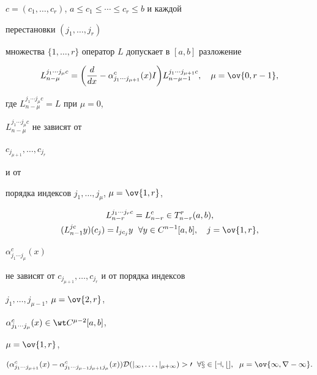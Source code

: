$c=(c_1,\dotsc,c_r)$, $a\le c_1\le\dotsb\le c_r\le b$ и каждой 


перестановки $(j_1,\dotsc,j_r)$ 


множества $\{1,\dotsc,r\}$ оператор $L$ допускает в $[a,b]$ разложение 


\begin{equation} 


L^{j_1\dotsb j_\mu c}_{n-\mu}=\bigg( 


\frac{d}{dx}-\alpha^c_{j_1\dotsb j_{\mu+1}}(x)I\bigg) 


L^{j_1\dotsb j_{\mu+1}c}_{n-\mu-1},\quad \mu=\ov{0,r-1}, 


\end{equation} 


где $L^{j_1\dotsb j_\mu c}_{n-\mu}=L$ при $\mu=0$, 


$L^{j_1\dotsb j_\mu c}_{n-\mu}$ не зависят от 


$c_{j_{\mu+1}},\dotsc,c_{j_r}$ 


и от 


порядка индексов $j_1,\dotsc,j_\mu$, $\mu=\ov{1,r}$, 


\begin{gather} 


L^{j_1\dotsb j_r c}_{n-r}=L^c_{n-r}\in 


T^r_{n-r}(a,b),\\ 


(L^{jc}_{n-1}y)(c_j)=l_{j c_j}y\ \; \forall y\in C^{n-1} 


[a,b],\quad j=\ov{1,r}, 


\end{gather} 


$\alpha^c_{j_1\dotsb j_\mu}(x)$ 


не зависят от $c_{j_{\mu+1}},\dotsc,c_{j_r}$ и от порядка индексов 


$j_1,\dotsc,j_{\mu-1}$, $\mu=\ov{2,r}$, 


$\alpha^c_{j_1\dotsb j_\mu}(x)\in\wt C^{\mu-2}[a,b]$, 


$\mu=\ov{1,r}$, 


\begin{equation} 


(\alpha^c_{j_1\dotsb j_{\mu+1}}(x)- 


\alpha^c_{j_1\dotsb j_{\mu-1}j_{\mu+1}j_\mu}(x))\cal D 


(j_1,\dotsc,j_{\mu+1})>0 \ \; \forall x\in[a,b],\ \; \mu=\ov{1,r-1}. 


\end{equation} 


